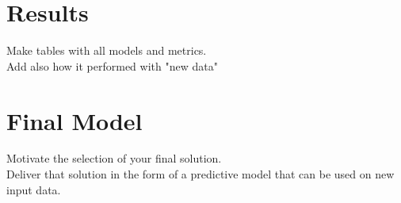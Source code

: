 \documentclass[11pt,a4paper]{article}
\begin{document}
 



\pagebreak
\section{Results}
Make tables with all models and metrics.\\
Add also how it performed with "new data"

\pagebreak
\section{Final Model}
Motivate the selection of your final solution.\\
Deliver that solution in the form of a predictive model that can be used on new input
data.
\end{document}
